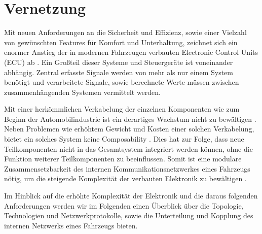\section{Vernetzung}
Mit neuen Anforderungen an die Sicherheit und Effizienz, sowie einer Vielzahl von gewünschten Features 
für Komfort und Unterhaltung, zeichnet sich ein enormer Anstieg der in modernen Fahrzeugen verbauten Electronic Control Units (ECU) ab \cite{TW_kim2014gateway}.
Ein Großteil dieser Systeme und Steuergeräte ist voneinander abhängig. Zentral erfasste Signale werden von mehr als nur einem
System benötigt und verarbeitete Signale, sowie berechnete Werte müssen zwischen zusammenhängenden Systemen vermittelt werden.

Mit einer herkömmlichen Verkabelung der einzelnen Komponenten wie zum Beginn der Automobilindustrie ist ein derartiges Wachstum
nicht zu bewältigen \cite{leen1999digital}. Neben Problemen wie erhöhtem Gewicht und Kosten einer solchen Verkabelung, bietet ein solches System keine
Composability \cite{reif2011bosch}. Dies hat zur Folge, dass neue Teilkomponenten nicht in das Gesamtsystem integriert werden können, ohne die Funktion 
weiterer Teilkomponenten zu beeinflussen. Somit ist eine modulare Zusammensetzbarkeit des internen Kommunikationsnetzwerkes eines Fahrzeugs nötig, um die 
steigende Komplexität der verbauten Elektronik zu bewältigen \cite{reif2011bosch}.

Im Hinblick auf die erhöhte Komplexität der Elektronik und die daraus folgenden Anforderungen werden wir im Folgenden
einen Überblick über die Topologie, Technologien und Netzwerkprotokolle, sowie die Unterteilung und Kopplung des internen Netzwerks eines Fahrzeugs bieten.

